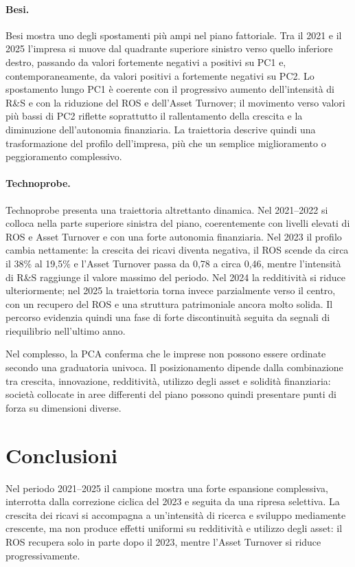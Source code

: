 \documentclass[11pt,a4paper]{article}
\begin{document}
\paragraph{Besi.}
Besi mostra uno degli spostamenti più ampi nel piano fattoriale. Tra il 2021 e il 2025 l'impresa si muove dal quadrante superiore sinistro verso quello inferiore destro, passando da valori fortemente negativi a positivi su PC1 e, contemporaneamente, da valori positivi a fortemente negativi su PC2. Lo spostamento lungo PC1 è coerente con il progressivo aumento dell'intensità di R\&S e con la riduzione del ROS e dell'Asset Turnover; il movimento verso valori più bassi di PC2 riflette soprattutto il rallentamento della crescita e la diminuzione dell'autonomia finanziaria. La traiettoria descrive quindi una trasformazione del profilo dell'impresa, più che un semplice miglioramento o peggioramento complessivo.

\paragraph{Technoprobe.}
Technoprobe presenta una traiettoria altrettanto dinamica. Nel 2021--2022 si colloca nella parte superiore sinistra del piano, coerentemente con livelli elevati di ROS e Asset Turnover e con una forte autonomia finanziaria. Nel 2023 il profilo cambia nettamente: la crescita dei ricavi diventa negativa, il ROS scende da circa il 38\% al 19,5\% e l'Asset Turnover passa da 0,78 a circa 0,46, mentre l'intensità di R\&S raggiunge il valore massimo del periodo. Nel 2024 la redditività si riduce ulteriormente; nel 2025 la traiettoria torna invece parzialmente verso il centro, con un recupero del ROS e una struttura patrimoniale ancora molto solida. Il percorso evidenzia quindi una fase di forte discontinuità seguita da segnali di riequilibrio nell'ultimo anno.

Nel complesso, la PCA conferma che le imprese non possono essere ordinate secondo una graduatoria univoca. Il posizionamento dipende dalla combinazione tra crescita, innovazione, redditività, utilizzo degli asset e solidità finanziaria: società collocate in aree differenti del piano possono quindi presentare punti di forza su dimensioni diverse.

\section{Conclusioni}

Nel periodo 2021--2025 il campione mostra una forte espansione complessiva, interrotta dalla correzione ciclica del 2023 e seguita da una ripresa selettiva. La crescita dei ricavi si accompagna a un'intensità di ricerca e sviluppo mediamente crescente, ma non produce effetti uniformi su redditività e utilizzo degli asset: il ROS recupera solo in parte dopo il 2023, mentre l'Asset Turnover si riduce progressivamente.
\end{document}
